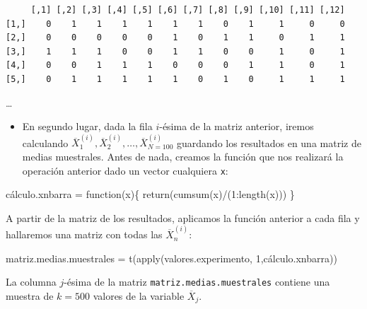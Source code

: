 \documentclass[
  letterpaper,
  DIV=11,
  numbers=noendperiod]{scrreprt}
\newenvironment{Shaded}{\begin{snugshade}}{\end{snugshade}}
\newcommand{\ControlFlowTok}[1]{\textcolor[rgb]{0.00,0.23,0.31}{#1}}
\newcommand{\DecValTok}[1]{\textcolor[rgb]{0.68,0.00,0.00}{#1}}
\newcommand{\FunctionTok}[1]{\textcolor[rgb]{0.28,0.35,0.67}{#1}}
\newcommand{\NormalTok}[1]{\textcolor[rgb]{0.00,0.23,0.31}{#1}}
\newcommand{\OtherTok}[1]{\textcolor[rgb]{0.00,0.23,0.31}{#1}}
\newcommand{\SpecialCharTok}[1]{\textcolor[rgb]{0.37,0.37,0.37}{#1}}
\providecommand{\tightlist}{%
  \setlength{\itemsep}{0pt}\setlength{\parskip}{0pt}}\usepackage{longtable,booktabs,array}
\begin{document}
\begin{verbatim}
     [,1] [,2] [,3] [,4] [,5] [,6] [,7] [,8] [,9] [,10] [,11] [,12]
[1,]    0    1    1    1    1    1    1    0    1     1     0     0
[2,]    0    0    0    0    0    1    0    1    1     0     1     1
[3,]    1    1    1    0    0    1    1    0    0     1     0     1
[4,]    0    0    1    1    1    0    0    0    1     1     0     1
[5,]    0    1    1    1    1    1    0    1    0     1     1     1
\end{verbatim}

\ldots{}

\begin{itemize}
\tightlist
\item
  En segundo lugar, dada la fila \(i\)-ésima de la matriz anterior,
  iremos calculando
  \(\overline{X}_1^{(i)},\overline{X}_2^{(i)},\ldots,\overline{X}_{N=100}^{(i)}\)
  guardando los resultados en una matriz de medias muestrales. Antes de
  nada, creamos la función que nos realizará la operación anterior dado
  un vector cualquiera \texttt{x}:
\end{itemize}

\begin{Shaded}
\begin{Highlighting}[]
\NormalTok{cálculo.xnbarra }\OtherTok{=} \ControlFlowTok{function}\NormalTok{(x)\{}
  \FunctionTok{return}\NormalTok{(}\FunctionTok{cumsum}\NormalTok{(x)}\SpecialCharTok{/}\NormalTok{(}\DecValTok{1}\SpecialCharTok{:}\FunctionTok{length}\NormalTok{(x)))}
\NormalTok{\}}
\end{Highlighting}
\end{Shaded}

A partir de la matriz de los resultados, aplicamos la función anterior a
cada fila y hallaremos una matriz con todas las
\(\overline{X}_n^{(i)}\):

\begin{Shaded}
\begin{Highlighting}[]
\NormalTok{matriz.medias.muestrales }\OtherTok{=} \FunctionTok{t}\NormalTok{(}\FunctionTok{apply}\NormalTok{(valores.experimento,}
                                   \DecValTok{1}\NormalTok{,cálculo.xnbarra))}
\end{Highlighting}
\end{Shaded}

La columna \(j\)-ésima de la matriz \texttt{matriz.medias.muestrales}
contiene una muestra de \(k=500\) valores de la variable
\(\overline{X}_j\).
\end{document}
